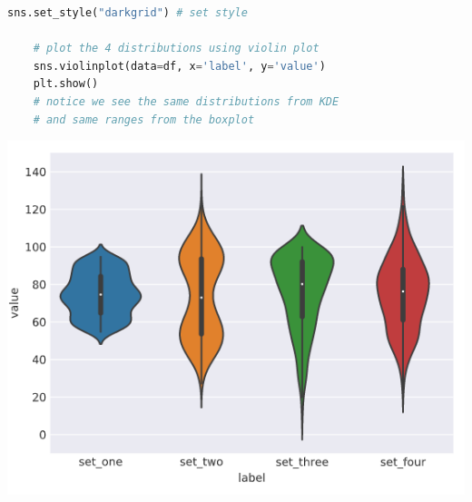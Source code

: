 \documentclass[11pt, a4paper]{article}
\begin{document}
\begin{spacing}{1.1}
\begin{minipage}[c]{10.3cm}
\begin{lstlisting}[language=Python]
	sns.set_style("darkgrid") # set style
	
	# plot the 4 distributions using violin plot
	sns.violinplot(data=df, x='label', y='value')
	plt.show()
	# notice we see the same distributions from KDE
	# and same ranges from the boxplot \end{lstlisting}\vspace*{1mm}
	\end{minipage}
	\begin{minipage}[c]{10cm}
		\includegraphics[scale=.48]{violin}
	\end{minipage} \\


\end{spacing}
\end{document}
